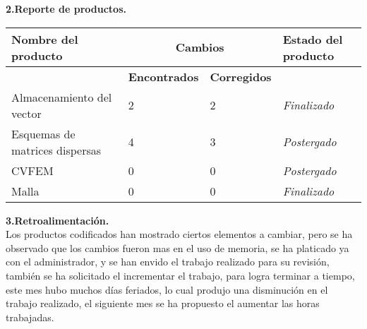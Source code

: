 \documentclass[12pt]{report}
\numberwithin{equation}{section}
\begin{document}
\begin{flushleft}

\textbf{2.Reporte de productos.}\\

\begin{table}[H]
\begin{tabular}{|m{4cm}|m{3cm}|m{3cm}|m{5cm}|}
\hline
\textbf{Nombre del producto} & \multicolumn{2}{c|}{\textbf{Cambios}}  
 & \textbf{Estado del producto}\\
 \hline
 & \textbf{Encontrados} &\textbf{Corregidos} & \\
\hline
\small{Almacenamiento del vector} & 2 & 2 &\scriptsize{\textit{Finalizado}} \\
\hline 
\small{Esquemas de matrices dispersas}& 4 & 3 & \scriptsize{\textit{{Postergado}}} \\
\hline
\small{CVFEM}  & 0 & 0 &\scriptsize{\textit{Postergado}} \\
\hline
\small{Malla} & 0 & 0 &\scriptsize{\textit{Finalizado}} \\
\hline
\end{tabular}
\label{tabla: TABLA Actividades CE }
\end{table}

\newpage

\textbf{3.Retroalimentaci\'on.}\\

\small{Los productos codificados han mostrado ciertos elementos a cambiar, pero se ha observado que los cambios fueron mas en el uso de memoria, se ha platicado ya con el administrador, y se han envido el trabajo realizado para su revisi\'on, también se ha solicitado el incrementar el trabajo, para logra terminar a tiempo, este mes hubo muchos días feriados, lo cual produjo una disminuci\'on en el trabajo realizado, el siguiente mes se ha propuesto el aumentar las horas trabajadas.}\\
\vspace{1em}


\end{flushleft}
\end{document}

